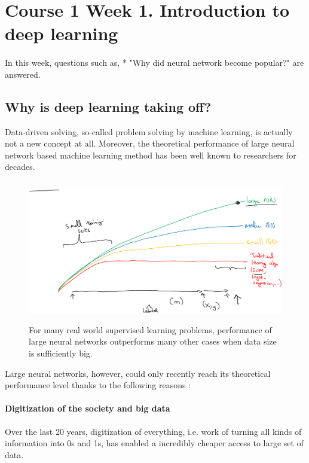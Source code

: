 

\section{Course 1 Week 1. Introduction to deep learning} 

\paragraph{}
In this week, questions such as,\newline
* "Why did neural network become popular?"\newline
are answered.

\subsection{Why is deep learning taking off?} Data-driven solving, so-called problem solving by machine learning, is actually not a new concept at all. Moreover, the theoretical performance of large neural network based machine learning method has been well known to researchers for decades. 
\begin{figure}[H]
\centering
\includegraphics[height=6.2cm]{c1w1_pic1.png}
\caption{For many real world supervised learning problems, performance of large neural networks outperforms many other cases when data size is sufficiently big.}
\end{figure}

Large neural networks, however, could only recently reach its theoretical performance level thanks to the following reasons : 

\paragraph{Digitization of the society and big data} Over the last 20 years, digitization of everything, i.e. work of turning all kinds of information into 0s and 1s, has enabled a incredibly cheaper access to large set of data. 

